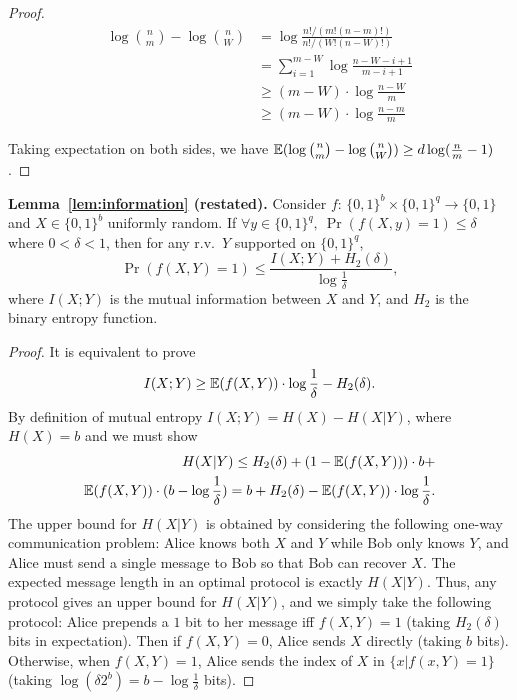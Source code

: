 \begin{proof}
  \begin{align*}
  \log {n \choose m}-\log {n \choose W}
  &= \log \frac{n!/(m!(n-m)!)}{n!/(W!(n-W)!)} \\
  &= \sum_{i=1}^{m-W}\log \frac{n-W-i+1}{m-i+1} \\
  &\ge (m-W)\cdot \log \frac{n-W}{m} \\
  &\ge (m-W)\cdot \log \frac{n-m}{m}
  \end{align*}
  
  Taking expectation on both sides, we have $\operatorname*{\mathbb{E}}(\log {n \choose m}-\log {n \choose W})\ge d \log (\frac{n}{m}-1)$. 
\end{proof}

\noindent \textbf{Lemma~\ref{lem:information} (restated).}
  Consider $f$: $\{0,1\}^b\times \{0,1\}^q\rightarrow \{0,1\}$ and $X\in\{0,1\}^b$ uniformly random. If $\forall y\in \{0,1\}^q,\ \Pr(f(X,y)=1)\le \delta$ where $0<\delta<1$, then for any r.v.\ $Y$ supported on $\{0,1\}^q$,
$$
  \Pr(f(X,Y)=1)\le \frac{I(X;Y)+H_2(\delta)}{\log \frac{1}{\delta}} ,
$$
  where $I(X;Y)$ is the mutual information between $X$ and $Y$, and $H_2$ is the binary entropy function.
\begin{proof}
  It is equivalent to prove 
$$I(X;Y)\ge \operatorname*{\mathbb{E}}(f(X,Y))\cdot \log\frac{1}{\delta}-H_2(\delta).$$
By definition of mutual entropy $I(X;Y)=H(X)-H(X|Y)$, where $H(X)=b$ and we must show
\begin{equation}
\begin{split}
H(X|Y)\le H_2(\delta)+(1-\operatorname*{\mathbb{E}}(f(X,Y)))\cdot b+ \\ \operatorname*{\mathbb{E}}(f(X,Y))\cdot (b-\log\frac{1}{\delta}) = b+H_2(\delta)-\operatorname*{\mathbb{E}}(f(X,Y))\cdot \log\frac{1}{\delta}.
\end{split}
\end{equation}
  The upper bound for $H(X|Y)$ is obtained by considering the following one-way communication problem: Alice knows both $X$ and $Y$ while Bob only knows $Y$, and Alice must send a single message to Bob so that Bob can recover $X$. The expected message length in an optimal protocol is exactly $H(X|Y)$.  Thus, any protocol gives an upper bound for $H(X|Y)$, and we simply take the following protocol: Alice prepends a $1$ bit to her message iff $f(X,Y) = 1$ (taking $H_2(\delta)$ bits in expectation). Then if $f(X,Y)=0$, Alice sends $X$ directly (taking $b$ bits). Otherwise, when $f(X,Y)=1$, Alice sends the index of $X$ in $\{x|f(x,Y)=1\}$ (taking $\log (\delta 2^b)=b-\log\frac{1}{\delta}$ bits).  
\end{proof}

